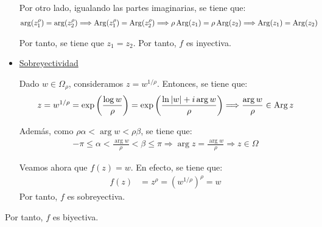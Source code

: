 \begin{ejercicio}
\begin{itemize}
        Por otro lado, igualando las partes imaginarias, se tiene que:
        \begin{align*}
            \arg(z_1^\rho) &= \arg(z_2^\rho) \Longrightarrow \operatorname{Arg}(z_1^\rho) = \operatorname{Arg}(z_2^\rho) \Longrightarrow \rho\operatorname{Arg}(z_1) = \rho\operatorname{Arg}(z_2)\Longrightarrow \operatorname{Arg}(z_1) = \operatorname{Arg}(z_2)
        \end{align*}

        Por tanto, se tiene que $z_1=z_2$. Por tanto, $f$ es inyectiva.

        \item \ul{Sobreyectividad}~
        
        Dado $w\in \Omega_\rho$, consideramos $z=w^{1/\rho}$. Entonces, se tiene que:
        \begin{equation*}
            z=w^{1/\rho} = \exp\left(\frac{\log w}{\rho}\right) = \exp\left(\frac{\ln |w| + i\arg w}{\rho}\right)\Longrightarrow
            \dfrac{\arg w}{\rho}\in \operatorname{Arg} z
        \end{equation*}

        Además, como $\rho\alpha < \arg w < \rho\beta$, se tiene que:
        \begin{align*}
            -\pi\leq \alpha < \frac{\arg w}{\rho} < \beta\leq \pi
            \Longrightarrow \arg z = \frac{\arg w}{\rho}\Longrightarrow z\in \Omega
        \end{align*}

        Veamos ahora que $f(z)=w$. En efecto, se tiene que:
        \begin{align*}
            f(z) &= z^\rho = \left(w^{1/\rho}\right)^\rho = w
        \end{align*}
        Por tanto, $f$ es sobreyectiva.
    \end{itemize}

    Por tanto, $f$ es biyectiva.
\end{ejercicio}


